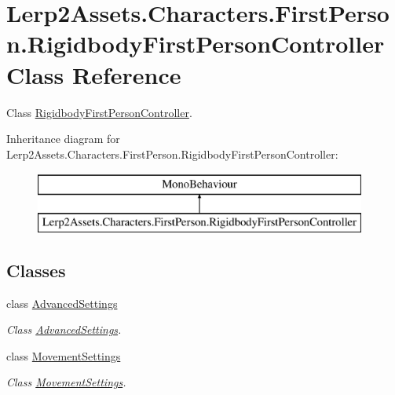\hypertarget{class_lerp2_assets_1_1_characters_1_1_first_person_1_1_rigidbody_first_person_controller}{}\section{Lerp2\+Assets.\+Characters.\+First\+Person.\+Rigidbody\+First\+Person\+Controller Class Reference}
\label{class_lerp2_assets_1_1_characters_1_1_first_person_1_1_rigidbody_first_person_controller}


Class \hyperlink{class_lerp2_assets_1_1_characters_1_1_first_person_1_1_rigidbody_first_person_controller}{Rigidbody\+First\+Person\+Controller}.  


Inheritance diagram for Lerp2\+Assets.\+Characters.\+First\+Person.\+Rigidbody\+First\+Person\+Controller\+:\begin{figure}[H]
\begin{center}
\leavevmode
\includegraphics[height=2.000000cm]{class_lerp2_assets_1_1_characters_1_1_first_person_1_1_rigidbody_first_person_controller}
\end{center}
\end{figure}
\subsection*{Classes}
\begin{DoxyCompactItemize}
\item 
class \hyperlink{class_lerp2_assets_1_1_characters_1_1_first_person_1_1_rigidbody_first_person_controller_1_1_advanced_settings}{Advanced\+Settings}
\begin{DoxyCompactList}\small\item\em Class \hyperlink{class_lerp2_assets_1_1_characters_1_1_first_person_1_1_rigidbody_first_person_controller_1_1_advanced_settings}{Advanced\+Settings}. \end{DoxyCompactList}\item 
class \hyperlink{class_lerp2_assets_1_1_characters_1_1_first_person_1_1_rigidbody_first_person_controller_1_1_movement_settings}{Movement\+Settings}
\begin{DoxyCompactList}\small\item\em Class \hyperlink{class_lerp2_assets_1_1_characters_1_1_first_person_1_1_rigidbody_first_person_controller_1_1_movement_settings}{Movement\+Settings}. \end{DoxyCompactList}\end{DoxyCompactItemize}
